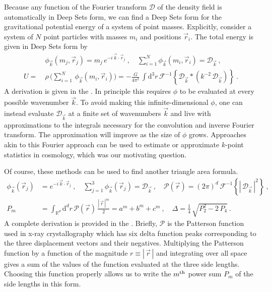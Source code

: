 \documentclass[10pt]{article}
\renewcommand{\d}{\mathrm{d}}
\newcommand{\abs}[1]{|\,{#1}\,|}
\begin{document}
Because any function of the Fourier transform $\mathcal{D}$ of the density field is automatically in Deep Sets form,
we can find a Deep Sets form for the gravitational potential energy of a system of point masses.
Explicitly, consider a system of $N$ point particles with masses $m_i$ and positions $\vec{r}_i$.
The total energy is given in Deep Sets form by
\begin{align}
    &\phi_{\vec{k}}(m_j, \vec{r}_j)
    =m_j \, e^{-i \, \vec{k} \cdot \vec{r}_j}
    ~,
    \quad
    \sum_{i=1}^{N} \phi_{\vec{k}}(m_i, \vec{r}_i)
    = \mathcal{D}_{\vec{k}}~,
    \nonumber\\
    U = \ &\rho \, \big( \sum_{i=1}^{N} \, \phi_{\vec{k}}(m_i, \vec{r}_i) \big)
    = -\frac{G}{4 \pi^2} \,
        \int \d^3 r \,
        \mathcal{F}^{-1}\!\left\{
            \mathcal{D}_{\vec{k}} \ast \left(
            k^{-2} \, \mathcal{D}_{\vec{k}} \right)
        \right\}~.
    \label{eq:EnergyDeepSets}
\end{align}
A derivation is given in the .
In principle this requires $\phi$ to be evaluated at every possible wavenumber $\vec{k}$.
To avoid making this infinite-dimensional $\phi$, one can instead evaluate $\mathcal{D}_{\vec{k}}$ at a finite set of wavenumbers $\vec{k}$ and live with approximations to the integrals necessary for the convolution and inverse Fourier transform.
The approximation will improve as the size of $\phi$ grows.
Approaches akin to this Fourier approach can be used \citep[and are used; e.g.,][]{Portillo+2018,Philcox+2022ENCORE} to estimate or approximate $k$-point statistics in cosmology, which was our motivating question.

Of course, these methods can be used to find another triangle area formula.
\begin{align}
    \phi_{\vec{k}} (\vec{r}_j) &= e^{-i \, \vec{k} \cdot \vec{r}_j}~,
    \quad
    \sum_{j=1}^{3} \phi_{\vec{k}}(\vec{r}_j) = \mathcal{D}_{\vec{k}}~,
    \quad
    \mathcal{P}(\vec{r}) = (2\pi)^d \, \mathcal{F}^{-1}\!\left\{
    \abs{ \mathcal{D}_{\vec{k}} }^2 \right\}~,
    \nonumber\\
    P_m &= \int_{\mathbb{R}^d} \d^d r \, \mathcal{P}(\vec{r}) \, \frac{\abs{\vec{r}}^m}{2}
    = a^m+b^m+c^m
    ~,
    \quad
    \Delta
    = \frac{1}{4} \, \sqrt{P_2^2 - 2 \, P_4}~.
    \label{eq:Fresult}
\end{align}
A complete derivation is provided in the .
Briefly, $\mathcal{P}$ is the Patterson function used in x-ray crystallography \citep{Patterson1934} which has six delta function peaks corresponding to the three displacement vectors and their negatives.
Multiplying the Patterson function by a function of the magnitude $r \equiv \abs{\vec{r}}$ and integrating over all space gives a sum of the values of the function evaluated at the three side lengths. 
Choosing this function properly allows us to write the $m^{\rm th}$ power sum $P_m$ of the side lengths in this form.
\end{document}
